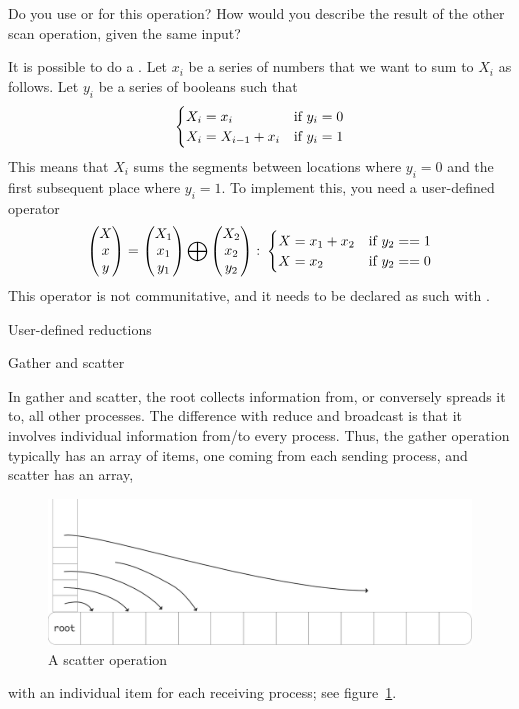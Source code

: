 \begin{exercise}
  Do you use  or  for this operation? How
  would you describe the result of the other scan operation, given the
  same input?
\end{exercise}

It is possible to do a . Let $x_i$ be a series of numbers
that we want to sum to $X_i$ as follows. Let $y_i$ be a series of booleans such that
\[ 
\begin{cases}
  X_i=x_i&\hbox{if $y_i=0$}\\
  X_i=X_{i-1}+x_i&\hbox{if $y_i=1$}
\end{cases}
\]
This means that $X_i$ sums the segments between locations where $y_i=0$ and the
first subsequent place where $y_i=1$. To implement this, you need a user-defined operator
\[ 
\begin{pmatrix}  X\\ x\\ y\end{pmatrix}
=
\begin{pmatrix}  X_1\\ x_1\\ y_1\end{pmatrix}
\bigoplus
\begin{pmatrix}  X_2\\ x_2\\ y_2\end{pmatrix}\colon
  \begin{cases}
    X=x_1+x_2&\hbox{if $y_2==1$}\\ X=x_2&\hbox{if $y_2==0$}
  \end{cases}
\]
This operator is not communitative, and it needs to be declared as such
with .

 {User-defined reductions}
\label{mpi:op-create}

 {Gather and scatter}

In gather and scatter, the root collects information from, or conversely spreads it to,
all other processes. The difference with reduce and broadcast is that it involves
individual information from/to every process. Thus, the gather operation typically 
has an array of items, one coming from each sending process, and scatter has an array,
\begin{figure}[ht]
  \includegraphics[scale=.12]{graphics/scatter-simple}
  \caption{A scatter operation}
  \label{fig:scatter}
\end{figure}
with an individual item for each receiving process; see figure~\ref{fig:scatter}.

